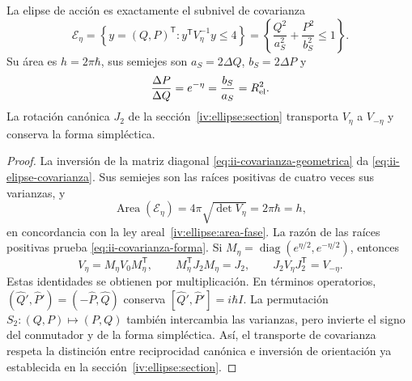 \begin{proposition}
\label{prop:ii-area-covarianza-reciprocidad}
La elipse de acción es exactamente el subnivel de covarianza
\begin{equation}
 \mathcal E_\eta
 =\left\{y=(Q,P)^{\mathsf T}:y^{\mathsf T}V_\eta^{-1}y\leq4\right\}
 =\left\{\frac{Q^2}{a_S^2}+\frac{P^2}{b_S^2}\leq1\right\}.
 \label{eq:ii-elipse-covarianza}
\end{equation}
Su área es \(h=2\pi\hbar\), sus semiejes son
\(a_S=2\Delta Q\), \(b_S=2\Delta P\) y
\begin{equation}
 \frac{\Delta P}{\Delta Q}=e^{-\eta}
 =\frac{b_S}{a_S}=R_{\rm el}^2.
 \label{eq:ii-covarianza-forma}
\end{equation}
La rotación canónica \(J_2\) de la sección~\ref{iv:ellipse:section} transporta
\(V_\eta\) a \(V_{-\eta}\) y conserva la forma simpléctica.
\end{proposition}

\begin{proof}
La inversión de la matriz diagonal
\eqref{eq:ii-covarianza-geometrica} da
\eqref{eq:ii-elipse-covarianza}. Sus semiejes son las raíces positivas de
cuatro veces sus varianzas, y
\[
 \operatorname{Area}(\mathcal E_\eta)
 =4\pi\sqrt{\det V_\eta}=2\pi\hbar=h,
\]
en concordancia con la ley areal~\eqref{iv:ellipse:area-fase}.
La razón de las raíces positivas prueba
\eqref{eq:ii-covarianza-forma}.
Si \(M_\eta=\operatorname{diag}(e^{\eta/2},e^{-\eta/2})\), entonces
\[
 V_\eta=M_\eta V_0M_\eta^{\mathsf T},\qquad
 M_\eta^{\mathsf T}J_2M_\eta=J_2,\qquad
 J_2V_\eta J_2^{\mathsf T}=V_{-\eta}.
\]
Estas identidades se obtienen por multiplicación. En términos operatorios,
\((\widehat Q',\widehat P')=(-\widehat P,\widehat Q)\) conserva
\([\widehat Q',\widehat P']=i\hbar I\). La permutación
\(S_2:(Q,P)\mapsto(P,Q)\) también intercambia las varianzas, pero invierte
el signo del conmutador y de la forma simpléctica. Así, el transporte de
covarianza respeta la distinción entre reciprocidad canónica e inversión
de orientación ya establecida en la sección~\ref{iv:ellipse:section}.
\end{proof}

